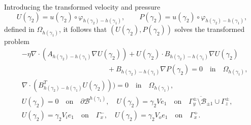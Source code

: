 \documentclass[11pt,a4paper]{amsart}
\theoremstyle{remark}
\theoremstyle{definition}
\numberwithin{equation}{section}
\numberwithin{proposition}{section}
\begin{document}
Introducing the transformed velocity and  pressure $$U(\gamma_2)= u(\gamma_2)\circ \varphi_{h(\gamma_2) - h(\gamma_1)}, \qquad P(\gamma_2)= u(\gamma_2)\circ \varphi_{h(\gamma_2) - h(\gamma_1)},$$ defined in $\Omega_{h(\gamma_1)}$, it follows that $(U(\gamma_2), P(\gamma_2))$ solves  the transformed problem
\begin{equation}
		\begin{aligned}
			&-\eta\nabla \cdot\left( A_{h(\gamma_2)-h(\gamma_1)} \nabla U(\gamma_2) \right)  +  U(\gamma_2)\cdot B_{h(\gamma_2)-h(\gamma_1)}\nabla U(\gamma_2)\\[5pt]& \qquad \qquad \qquad \qquad \qquad \qquad + B_{h(\gamma_2)-h(\gamma_1) }\nabla P(\gamma_2)=0\quad\text{in}\quad \Omega_{h(\gamma_1)}, \\[5pt]
			&\nabla\cdot (B_{h(\gamma_2)-h(\gamma_1)}^TU(\gamma_2)))=0\quad\text{in}\quad \Omega_{h(\gamma_1)},\\[5pt]&	U(\gamma_2)=0 \quad \text{on} \quad  \partial \mathcal{B}^{h(\gamma_1)} ,\quad U(\gamma_2)=\gamma_2 Ve_1\quad \text{on} \quad \overline{\Gamma_{y}^\pm \setminus \mathcal{B}_{\pm 1}}\cup\Gamma_z^\pm,\\[5pt]
			&U(\gamma_2)= \gamma_2 V_ie_1\quad \text{on} \quad \Gamma_x^-,\quad U(\gamma_2)= \gamma_2 V_oe_1\quad\text{on} \quad \Gamma_x^+.
		\end{aligned}
\end{equation}
\end{document}
